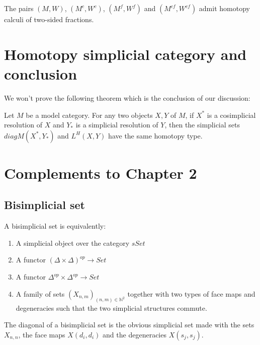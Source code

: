 \begin{refsection}
\begin{prop}
The pairs $(M,W)$, $(M^{c},W^{c})$, $(M^{f},W^{f})$ and $(M^{cf},W^{cf})$ admit homotopy calculi of two-sided fractions.
\end{prop}

\section{Homotopy simplicial category and conclusion}

We won't prove the following theorem which is the conclusion of our discussion:
\begin{thm}
Let $M$ be a model category. For any two objects $X,Y$ of $M$, if $X^*$ is a cosimplicial resolution of $X$ and $Y_*$ is a simplicial resolution of $Y$, then the simplicial sets $diag M(X^*,Y_*)$ and $L^H(X,Y)$ have the same homotopy type.
\end{thm}

\section{Complements to Chapter 2}

\subsection{Bisimplicial set}

\begin{defin}
A bisimplicial set is equivalently:
\begin{enumerate}
\item A simplicial object over the category $sSet$
\item A functor $(\Delta \times \Delta)^{op} \rightarrow Set$
\item A functor $\Delta^{op} \times \Delta^{op} \rightarrow Set$
\item A family of sets $(X_{n,m})_{(n,m) \in \mathbb{N}^2}$ together with two types of face maps and degeneracies such that the two simplicial structures commute.
\end{enumerate}
\end{defin}


The diagonal of a bisimplicial set is the obvious simplicial set made with the sets $X_{n,n}$, the face maps $X(d_i,d_i)$ and the degeneracies $X(s_j,s_j).$

\begin{comment}
\subsection{Auto equivalenc monoid}


\end{comment}
\end{refsection}
